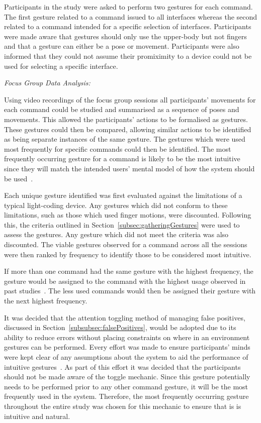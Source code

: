 \documentclass[link]{IWCOMP}
\begin{document}
Participants in the study were asked to perform two gestures for each command.
The first gesture related to a command issued to all interfaces whereas the second related to a command intended for a specific selection of interfaces.
Participants were made aware that gestures should only use the upper-body but not fingers and that a gesture can either be a pose or movement.
Participants were also informed that they could not assume their promiximity to a device could not be used for selecting a specific interface.

\emph{Focus Group Data Analysis:}

Using video recordings of the focus group sessions all participants' movements for each command could be studied and summarised as a sequence of poses and movements.
This allowed the participants' actions to be formalised as gestures.
These gestures could then be compared, allowing similar actions to be identified as being separate instances of the same gesture.
The gestures which were used most frequently for specific commands could then be identified.
The most frequently occurring gesture for a command is likely to be the most intuitive since they will match the intended users' mental model of how the system should be used~\cite{Nielsen2004,Ruiz2011,Wobbrock2009}.

Each unique gesture identified was first evaluated against the limitations of a typical light-coding device.
Any gestures which did not conform to these limitations, such as those which used finger motions, were discounted.
Following this, the criteria outlined in Section~\ref{subsec:gatheringGestures} were used to assess the gestures.
Any gesture which did not meet the criteria was also discounted.
The viable gestures observed for a command across all the sessions were then ranked by frequency to identify those to be considered most intuitive.

If more than one command had the same gesture with the highest frequency, the gesture would be assigned to the command with the highest usage observed in past studies~\cite{HatchA.HigginsSMercier2009}.
The less used commands would then be assigned their gesture with the next highest frequency.

It was decided that the attention toggling method of managing false positives, discussed in Section~\ref{subsubsec:falsePositives}, would be adopted due to its ability to reduce errors without placing constraints on where in an environment gestures can be performed.
Every effort was made to ensure participants' minds were kept clear of any assumptions about the system to aid the performance of intuitive gestures~\cite{Nielsen2004}.
As part of this effort it was decided that the participants should not be made aware of the toggle mechanic.
Since this gesture potentially needs to be performed prior to any other command gesture, it will be the most frequently used in the system.
Therefore, the most frequently occurring gesture throughout the entire study was chosen for this mechanic to ensure that is is intuitive and natural.
\end{document}
